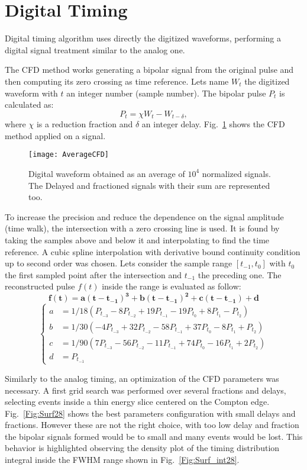\section*{Digital Timing}
Digital timing algorithm uses directly the digitized waveforms, performing a digital signal treatment similar to the analog one.
 
The CFD method works generating a bipolar signal from the original pulse and then computing its zero crossing as time reference. Lets name $W_t$ the digitized waveform with $t$ an integer number (sample number). The bipolar pulse $P_t$ is calculated as:
\begin{equation}
P_t=\chi W_t-W_{t-\delta},
\label{eq:bipolarCFD}
\end{equation}
where $\chi$ is a reduction fraction and $\delta$ an integer delay.  Fig.~\ref{Fig:DigitalCFD} shows the CFD method applied on a signal. 
\begin{figure}[h!]
	\centering
	\texttt{[image: AverageCFD]}
	\caption{Digital waveform obtained as an average of $10^4$ normalized signals. The Delayed and fractioned signals with their sum are represented too. }
	\label{Fig:DigitalCFD}
\end{figure}

\newpage
To increase the precision and reduce the dependence on the signal amplitude (time walk), the intersection with a zero crossing line is used. It is found by taking the samples above and below  it  and interpolating to find the time reference. 
A cubic spline interpolation with derivative bound continuity condition up to second order was chosen.
Lets consider the sample range $[t_{-1},t_{0}]$ with $t_{0}$ the first sampled point after the intersection and $t_{-1}$ the preceding one. The reconstructed pulse $f(t)$ inside the range is evaluated as follow:\\
\[\mathbf{f(t)=a (t-t_{-1})^3+b (t-t_{-1})^2+c (t-t_{-1})+d}\]
\[
\left\{
\begin{aligned}
a &=1/18 (P_{t_{-3}}-8 P_{t_{-2}}+19 P_{t_{-1}}-19 P_{t_{0}}+8 P_{t_{1}}-P_{t_{2}})\\
b &=1/30 (-4 P_{t_{-3}}+32 P_{t_{-2}}-58 P_{t_{-1}}+37 P_{t_{0}}-8 P_{t_{1}}+ P_{t_{2}})\\
c &=1/90 (7 P_{t_{-3}}-56 P_{t_{-2}}-11 P_{t_{-1}}+74 P_{t_{0}}-16 P_{t_{1}}+2 P_{t_{2}})\\
d &=P_{t_{-1}}
\end{aligned}
\right.
\]

Similarly to the analog timing, an optimization of the CFD parameters was necessary.  A first grid search was performed over several fractions and delays, selecting events inside a thin energy slice centered on the Compton edge.  Fig.~\ref{Fig:Surf28} shows the best parameters configuration with small delays and fractions. However these are not the right choice, with too low delay and fraction the bipolar signals formed would be to small and many events would be lost. This behavior is highlighted observing the density plot of the timing distribution integral inside the FWHM range shown in Fig.~\ref{Fig:Surf_int28}. 


